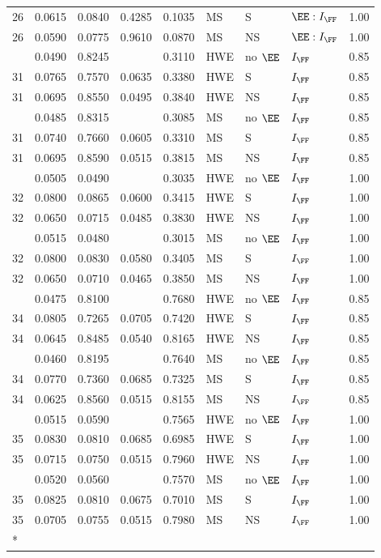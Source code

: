\begin{longtable}[t]{lllllllll}
26 & 0.0615 & 0.0840 & 0.4285 & 0.1035 & MS & S & $\EE:I_{\FF}$ & 1.00\\
26 & 0.0590 & 0.0775 & 0.9610 & 0.0870 & MS & NS & $\EE:I_{\FF}$ & 1.00\\
\addlinespace
31 & 0.0490 & 0.8245 &  & 0.3110 & HWE & no $\EE$ & $I_{\FF}$ & 0.85\\
31 & 0.0765 & 0.7570 & 0.0635 & 0.3380 & HWE & S & $I_{\FF}$ & 0.85\\
31 & 0.0695 & 0.8550 & 0.0495 & 0.3840 & HWE & NS & $I_{\FF}$ & 0.85\\
\addlinespace
31 & 0.0485 & 0.8315 &  & 0.3085 & MS & no $\EE$ & $I_{\FF}$ & 0.85\\
31 & 0.0740 & 0.7660 & 0.0605 & 0.3310 & MS & S & $I_{\FF}$ & 0.85\\
31 & 0.0695 & 0.8590 & 0.0515 & 0.3815 & MS & NS & $I_{\FF}$ & 0.85\\
\addlinespace
32 & 0.0505 & 0.0490 &  & 0.3035 & HWE & no $\EE$ & $I_{\FF}$ & 1.00\\
32 & 0.0800 & 0.0865 & 0.0600 & 0.3415 & HWE & S & $I_{\FF}$ & 1.00\\
32 & 0.0650 & 0.0715 & 0.0485 & 0.3830 & HWE & NS & $I_{\FF}$ & 1.00\\
\addlinespace
32 & 0.0515 & 0.0480 &  & 0.3015 & MS & no $\EE$ & $I_{\FF}$ & 1.00\\
32 & 0.0800 & 0.0830 & 0.0580 & 0.3405 & MS & S & $I_{\FF}$ & 1.00\\
32 & 0.0650 & 0.0710 & 0.0465 & 0.3850 & MS & NS & $I_{\FF}$ & 1.00\\
\addlinespace
34 & 0.0475 & 0.8100 &  & 0.7680 & HWE & no $\EE$ & $I_{\FF}$ & 0.85\\
34 & 0.0805 & 0.7265 & 0.0705 & 0.7420 & HWE & S & $I_{\FF}$ & 0.85\\
34 & 0.0645 & 0.8485 & 0.0540 & 0.8165 & HWE & NS & $I_{\FF}$ & 0.85\\
\addlinespace
34 & 0.0460 & 0.8195 &  & 0.7640 & MS & no $\EE$ & $I_{\FF}$ & 0.85\\
34 & 0.0770 & 0.7360 & 0.0685 & 0.7325 & MS & S & $I_{\FF}$ & 0.85\\
34 & 0.0625 & 0.8560 & 0.0515 & 0.8155 & MS & NS & $I_{\FF}$ & 0.85\\
\addlinespace
35 & 0.0515 & 0.0590 &  & 0.7565 & HWE & no $\EE$ & $I_{\FF}$ & 1.00\\
35 & 0.0830 & 0.0810 & 0.0685 & 0.6985 & HWE & S & $I_{\FF}$ & 1.00\\
35 & 0.0715 & 0.0750 & 0.0515 & 0.7960 & HWE & NS & $I_{\FF}$ & 1.00\\
\addlinespace
35 & 0.0520 & 0.0560 &  & 0.7570 & MS & no $\EE$ & $I_{\FF}$ & 1.00\\
35 & 0.0825 & 0.0810 & 0.0675 & 0.7010 & MS & S & $I_{\FF}$ & 1.00\\
35 & 0.0705 & 0.0755 & 0.0515 & 0.7980 & MS & NS & $I_{\FF}$ & 1.00\\*
\end{longtable}
